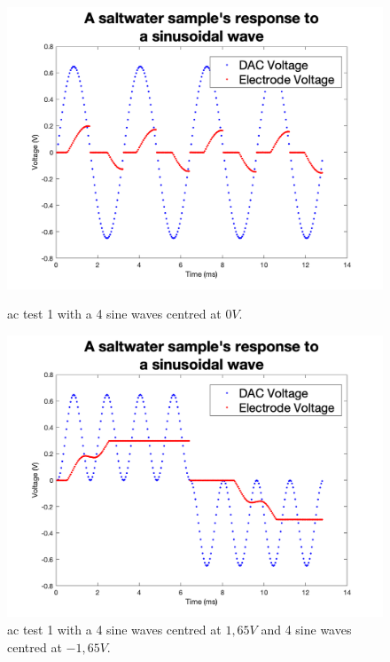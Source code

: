 \begin{figure}[ht]
    \begin{minipage}{0.5\textwidth}
        \centering
        \includegraphics[width=\textwidth]{Figures/Testing/TiAC1}
        \caption{\gls{ac} test 1 with a 4 sine waves centred at $0V$.}
        \label{fig:test17} %
    \end{minipage}
    \begin{minipage}{0.5\textwidth}
        \centering
        \includegraphics[width=\textwidth]{Figures/Testing/TiAC2}
        \caption{\gls{ac} test 1 with a 4 sine waves centred at $1,65V$ and 4 sine waves centred at $-1,65V$.}
        \label{fig:test18} %
    \end{minipage}
\end{figure}

